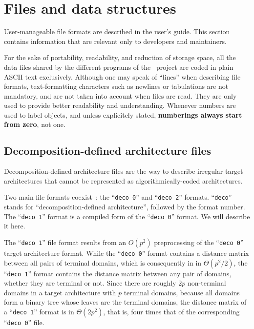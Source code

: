 
\section{Files and data structures}
\label{sec-file}

User-manageable file formats are described in the \scotch user's
guide. This section contains information that are relevant only to
developers and maintainers.

For the sake of portability, readability, and reduction of storage space,
all the data files shared by the different programs of the
\scotch\ project are coded in plain ASCII text exclusively.
Although one may speak of ``lines'' when describing file formats,
text-formatting characters such as newlines or tabulations are not
mandatory, and are not taken into account when files are read.
They are only used to provide better readability and understanding.
Whenever numbers are used to label objects, and unless explicitely
stated, \textbf{numberings always start from zero}, not one.

\subsection{Decomposition-defined architecture files}
\label{sec-file-target-deco-one}

Decomposition-defined architecture files are the way to describe
irregular target architectures that cannot be represented as
algorithmically-coded architectures.

Two main file formats coexist~: the ``\texttt{deco 0}'' and
``\texttt{deco 2}'' formats. ``\texttt{deco}'' stands for
``decomposition-defined architecture'', followed by the format
number. The ``\texttt{deco 1}'' format is a compiled form of the
``\texttt{deco 0}'' format. We will describe it here.

The ``\texttt{deco 1}'' file format results from an $O(p^2)$
preprocessing of the ``\texttt{deco 0}'' target architecture
format. While the ``\texttt{deco 0}'' format contains a distance
matrix between all pairs of terminal domains, which is consequently in
in $\Theta(p^2/2)$, the ``\texttt{deco 1}'' format contains the
distance matrix between any pair of domains, whether they are terminal
or not. Since there are roughly $2p$ non-terminal domains in a
target architecture with $p$ terminal domains, because all domains
form a binary tree whose leaves are the terminal domains, the distance
matrix of a ``\texttt{deco 1}'' format is in $\Theta(2p^2)$, that is,
four times that of the corresponding ``\texttt{deco 0}'' file.

